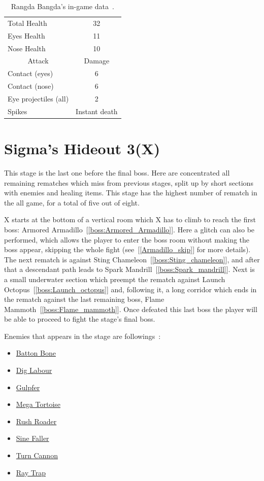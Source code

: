\begin{table}
	\centering
	\begin{tabular}[h]{l c}
		\toprule
		Total Health  & 32\\
		Eyes Health & 11\\
		Nose Health & 10\\
		\midrule
		\multicolumn{1}{c}{Attack} & \multicolumn{1}{c}{Damage}\\
		Contact (eyes) & 6\\
		Contact (nose) & 6\\
		Eye projectiles (all) & 2\\
		Spikes & Instant death\\
		\bottomrule
	\end{tabular}
	\caption{Rangda Bangda's in-game data~\cite{wiki:Rangda_bangda}. }
\end{table}

\section{Sigma's Hideout 3(X)}
This stage is the last one before the final boss. Here are concentrated all remaining rematches which miss from previous stages, split up by short sections with enemies and healing items. This stage has the highest number of rematch in the all game, for a total of five out of eight.

X starts at the bottom of a vertical room which X has to climb to reach the first boss: Armored Armadillo~[\ref{boss:Armored_Armadillo}]. Here a glitch can also be performed, which allows the player to enter the boss room without making the boss appear, skipping the whole fight (see~[\ref{Armadillo_skip}] for more details). The next rematch is against Sting Chameleon~[\ref{boss:Sting_chameleon}], and after that a descendant path leads to Spark Mandrill~[\ref{boss:Spark_mandrill}]. Next is a small underwater section which preempt the rematch against Launch Octopus~[\ref{boss:Launch_octopus}] and, following it, a long corridor which ends in the rematch against the last remaining boss, Flame Mammoth~[\ref{boss:Flame_mammoth}]. Once defeated this last boss the player will be able to proceed to fight the stage's final boss.

Enemies that appears in the stage are followings~\cite{wiki:sigma_stages}:

\begin{itemize}
	\item \hyperlink{enem:Batton_Bone}{Batton Bone}
	\item \hyperlink{enem:Dig_Labour}{Dig Labour}
	\item \hyperlink{enem:Gulpfer}{Gulpfer}
	\item \hyperlink{enem:Mega_Tortoise}{Mega Tortoise}
	\item \hyperlink{enem:Rush_Roader}{Rush Roader}
	\item \hyperlink{enem:Sine_Faller}{Sine Faller}
	\item \hyperlink{enem:Turn_Cannon}{Turn Cannon}
	\item \hyperlink{enem:Ray_Trap}{Ray Trap}
\end{itemize} 

